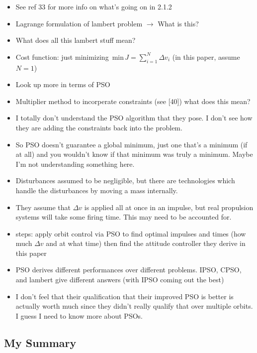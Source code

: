 \documentclass[11pt]{article}
\begin{document}
\begin{itemize}[noitemsep]
    \item See ref 33 for more info on what's going on in 2.1.2
    \item Lagrange formulation of lambert problem $\rightarrow$ What is this?
    \item What does all this lambert stuff mean?
    \item Cost function: just minimizing $\,\text{min}\, J = \sum_{i=1}^{N}\Delta v_i$ (in this paper, assume $N=1$)
    \item Look up more in terms of PSO
    \item Multiplier method to incorperate constraints (see [40]) what does this mean?
    \item I totally don't understand the PSO algorithm that they pose. I don't see how they are adding the constraints back into the problem.
    \item So PSO doesn't guarantee a global minimum, just one that's a minimum (if at all) and you wouldn't know if that minimum was truly a minimum. Maybe I'm not understanding something here.
    \item Disturbances assumed to be negligible, but there are technologies which handle the disturbances by moving a mass internally.
    \item They assume that $\Delta v$ is applied all at once in an impulse, but real propulsion systems will take some firing time. This may need to be accounted for.
    \item steps: apply orbit control via PSO to find optimal impulses and times (how much $\Delta v$ and at what time) then find the attitude controller they derive in this paper
    \item PSO derives different performances over different problems. IPSO, CPSO, and lambert give different answers (with IPSO coming out the best)
    \item I don't feel that their qualification that their improved PSO is better is actually worth much since they didn't really qualify that over multiple orbits. I guess I need to know more about PSOs.
\end{itemize}

\subsection{My Summary}
\end{document}
